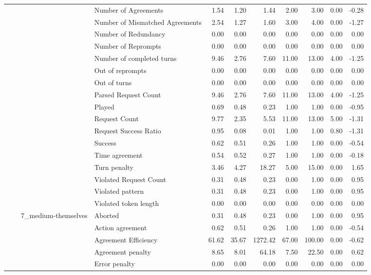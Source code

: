 \begin{tabular}{llllrrrrrrr}
 &  &  & Number of Agreements & 1.54 & 1.20 & 1.44 & 2.00 & 3.00 & 0.00 & -0.28 \\
 &  &  & Number of Mismatched Agreements & 2.54 & 1.27 & 1.60 & 3.00 & 4.00 & 0.00 & -1.27 \\
 &  &  & Number of Redundancy & 0.00 & 0.00 & 0.00 & 0.00 & 0.00 & 0.00 & 0.00 \\
 &  &  & Number of Reprompts & 0.00 & 0.00 & 0.00 & 0.00 & 0.00 & 0.00 & 0.00 \\
 &  &  & Number of completed turns & 9.46 & 2.76 & 7.60 & 11.00 & 13.00 & 4.00 & -1.25 \\
 &  &  & Out of reprompts & 0.00 & 0.00 & 0.00 & 0.00 & 0.00 & 0.00 & 0.00 \\
 &  &  & Out of turns & 0.00 & 0.00 & 0.00 & 0.00 & 0.00 & 0.00 & 0.00 \\
 &  &  & Parsed Request Count & 9.46 & 2.76 & 7.60 & 11.00 & 13.00 & 4.00 & -1.25 \\
 &  &  & Played & 0.69 & 0.48 & 0.23 & 1.00 & 1.00 & 0.00 & -0.95 \\
 &  &  & Request Count & 9.77 & 2.35 & 5.53 & 11.00 & 13.00 & 5.00 & -1.31 \\
 &  &  & Request Success Ratio & 0.95 & 0.08 & 0.01 & 1.00 & 1.00 & 0.80 & -1.31 \\
 &  &  & Success & 0.62 & 0.51 & 0.26 & 1.00 & 1.00 & 0.00 & -0.54 \\
 &  &  & Time agreement & 0.54 & 0.52 & 0.27 & 1.00 & 1.00 & 0.00 & -0.18 \\
 &  &  & Turn penalty & 3.46 & 4.27 & 18.27 & 5.00 & 15.00 & 0.00 & 1.65 \\
 &  &  & Violated Request Count & 0.31 & 0.48 & 0.23 & 0.00 & 1.00 & 0.00 & 0.95 \\
 &  &  & Violated pattern & 0.31 & 0.48 & 0.23 & 0.00 & 1.00 & 0.00 & 0.95 \\
 &  &  & Violated token length & 0.00 & 0.00 & 0.00 & 0.00 & 0.00 & 0.00 & 0.00 \\
\cline{3-11}
 &  & \multirow[t]{27}{*}{7_medium-themselves} & Aborted & 0.31 & 0.48 & 0.23 & 0.00 & 1.00 & 0.00 & 0.95 \\
 &  &  & Action agreement & 0.62 & 0.51 & 0.26 & 1.00 & 1.00 & 0.00 & -0.54 \\
 &  &  & Agreement Efficiency & 61.62 & 35.67 & 1272.42 & 67.00 & 100.00 & 0.00 & -0.62 \\
 &  &  & Agreement penalty & 8.65 & 8.01 & 64.18 & 7.50 & 22.50 & 0.00 & 0.62 \\
 &  &  & Error penalty & 0.00 & 0.00 & 0.00 & 0.00 & 0.00 & 0.00 & 0.00 \\

\end{tabular}
